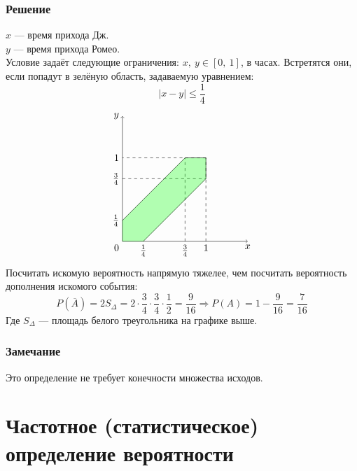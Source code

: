 \documentclass[12pt, a4paper]{article}
\begin{document}
    \subsubsection*{Решение}
    $x$ --- время прихода Дж.\\
    $y$ --- время прихода Ромео.\\
    Условие задаёт следующие ограничения: $x,\ y\in [0,\ 1]$, в часах. Встретятся они, если попадут в зелёную область, задаваемую уравнением:
    \[|x - y| \leq \frac{1}{4}\]
    \[
      \begin{tikzpicture}[scale=1.5]
        \coordinate (first) at (0, 0.5);
        \coordinate (second) at (1.5, 2);
        \coordinate (third) at (0.5, 0);
        \coordinate (fourth) at (2, 1.5);
        \coordinate (center) at (0, 0);
        \coordinate (y) at (0, 2);
        \coordinate (x) at (2, 0);
        \node at (center) [anchor=north east] {0};
        \node at (y) [anchor=east] {1};
        \node at (x) [anchor=north] {1};
        \node at (first) [anchor=east] {$\frac 1 4$};
        \node at (third) [anchor=north] {$\frac 1 4$};
        \node at (1.5, 0) [anchor=north] {$\frac 3 4$};
        \node at (0, 1.5) [anchor=east] {$\frac 3 4$};
        \draw[dashed] (0, 1.5) -- (2, 1.5);
        \draw[dashed] (1.5, 0) -- (1.5, 2);
        \filldraw[green, opacity=0.3] (0, 0) -- (first) -- (second) -- (2, 2) -- (fourth) -- (third) -- cycle; 
        \draw[->] (0, 0) -- (3, 0) node[anchor=north]{$x$};
        \draw[->] (0, 0) -- (0, 3) node[anchor=east]{$y$};
        \draw (first) -- (second);
        \draw (third) -- (fourth);
        \draw[dashed] (2, 0) -- (2, 2);
        \draw[dashed] (2, 2) -- (0, 2);
        \draw (second) -- (2, 2);
        \draw (fourth) -- (2, 2);
      \end{tikzpicture}
    \]
    Посчитать искомую вероятность напрямую тяжелее, чем посчитать вероятность дополнения искомого события:  
    \[P(\overline{A}) = 2 S_{\Delta} = 2 \cdot  \frac{3}{4} \cdot \frac{3}{4} \cdot \frac{1}{2} = \frac{9}{16}\Rightarrow P(A) = 1 - \frac{9}{16} = \frac{7}{16}\]
    Где $S_{\Delta}$ --- площадь белого треугольника на графике выше.
    \subsubsection*{Замечание}
    Это определение не требует конечности множества исходов.
    \section*{Частотное (статистическое) определение вероятности}
\end{document}
